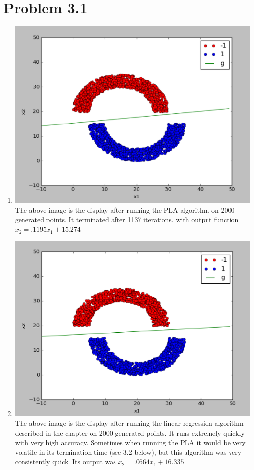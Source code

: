 \documentclass[12pt]{article}
\begin{document}
\section*{Problem 3.1}
\begin{enumerate}[label=(\alph*)]
	\item \includegraphics[scale=.5]{3-1a.png}
	\\ The above image is the display after running the PLA algorithm on 2000 generated points. It terminated after 1137 iterations, with output function $x_2 = .1195x_1 + 15.274$
	\item \includegraphics[scale=.5]{3-1b.png}
	\\ The above image is the display after running the linear regression algorithm described in the chapter on 2000 generated points. It runs extremely quickly with very high accuracy. Sometimes when running the PLA it would be very volatile in its termination time (see 3.2 below), but this algorithm was very consistently quick. Its output was $x_2 = .0664x_1 + 16.335$
\end{enumerate}
\end{document}
